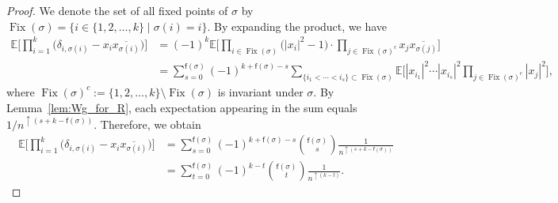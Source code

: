 \documentclass[pdftex]{sigma}
\numberwithin{equation}{section}
\theoremstyle{definition}
\newcommand{\fix}[1]{\mathsf{f}(#1)}
\DeclareMathOperator{\Fix}{Fix}
\begin{document}
\begin{proof}
We denote the set of all fixed points of $\sigma$ by
$\Fix (\sigma)= \{i \in\{1,2,\dots,k\} \mid \sigma(i)=i\}$.
By expanding the product, we have
\begin{align*}
 \mathbb{E} \Biggl[
\prod_{i=1}^k \bigl( \delta_{i,\sigma(i)} - x_i \overline{x_{\sigma(i)}} \bigl) \Biggr] &
 = (-1)^k \mathbb{E} \Biggl[ \prod_{i \in \Fix(\sigma)} \bigl(|x_i|^2-1\bigr) \cdot
 \prod_{j \in \Fix(\sigma)^c} x_j \overline{x_{\sigma(j)}} \Biggr] \\
 &= \sum_{s=0}^{\fix{\sigma}} (-1)^{k+\fix{\sigma}-s} \!\!\sum_{ \{i_1< \cdots <i_{s} \} \subset \Fix(\sigma)}\!\!
 \mathbb{E} \Biggl[ |x_{i_1}|^2 \cdots |x_{i_{s}}|^2 \prod_{j \in \Fix(\sigma)^c}|x_j|^2\Biggr],
\end{align*}
where $\Fix(\sigma)^c :=\{1,2,\dots,k \} \setminus \Fix(\sigma)$ is invariant under $\sigma$.
By Lemma~\ref{lem:Wg_for_R}, each expectation appearing in the sum equals $1/n^{\uparrow (s+k-\fix{\sigma})}$.
Therefore, we obtain
\begin{align*}
 \mathbb{E} \Biggl[
\prod_{i=1}^k \bigl( \delta_{i,\sigma(i)} - x_i \overline{x_{\sigma(i)}} \bigl) \Biggr]
&= \sum_{s=0}^{\fix{\sigma}} (-1)^{k+\fix{\sigma}-s} \binom{\fix{\sigma}}{s} \frac{1}{n^{\uparrow (s+k-\fix{\sigma})}} \\
&= \sum_{t=0}^{\fix{\sigma}} (-1)^{k-t} \binom{\fix{\sigma}}{t} \frac{1}{n^{\uparrow (k-t)}}.\tag*{\qed}
\end{align*}\renewcommand{\qed}{}
\end{proof}
\end{document}

